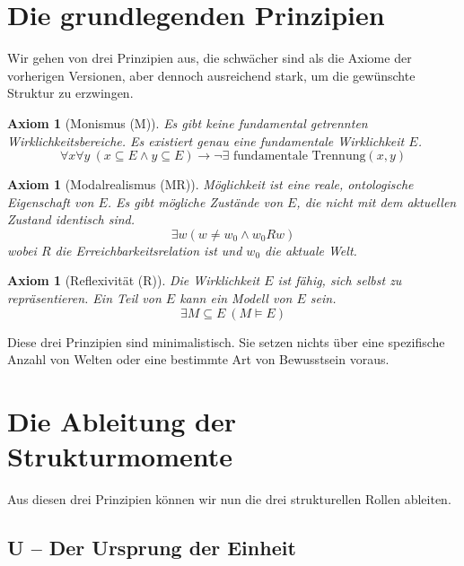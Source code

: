 \documentclass[12pt,a4paper]{article}
\newtheorem{axiom}[theorem]{Axiom}
\begin{document}
\section{Die grundlegenden Prinzipien}

Wir gehen von drei Prinzipien aus, die schwächer sind als die Axiome der vorherigen Versionen, aber dennoch ausreichend stark, um die gewünschte Struktur zu erzwingen.

\begin{axiom}[Monismus (M)]
\label{ax:monism}
Es gibt keine fundamental getrennten Wirklichkeitsbereiche. Es existiert genau eine fundamentale Wirklichkeit \(E\).
\begin{equation}
\forall x \forall y \ (x \subseteq E \land y \subseteq E) \rightarrow \neg \exists \text{ fundamentale Trennung}(x, y)
\end{equation}
\end{axiom}

\begin{axiom}[Modalrealismus (MR)]
\label{ax:modalrealism}
Möglichkeit ist eine reale, ontologische Eigenschaft von \(E\). Es gibt mögliche Zustände von \(E\), die nicht mit dem aktuellen Zustand identisch sind.
\begin{equation}
\exists w (w \neq w_0 \land w_0 R w)
\end{equation}
wobei \(R\) die Erreichbarkeitsrelation ist und \(w_0\) die aktuale Welt.
\end{axiom}

\begin{axiom}[Reflexivität (R)]
\label{ax:reflexivity}
Die Wirklichkeit \(E\) ist fähig, sich selbst zu repräsentieren. Ein Teil von \(E\) kann ein Modell von \(E\) sein.
\begin{equation}
\exists M \subseteq E \ (M \models E)
\end{equation}
\end{axiom}

Diese drei Prinzipien sind minimalistisch. Sie setzen nichts über eine spezifische Anzahl von Welten oder eine bestimmte Art von Bewusstsein voraus.

\section{Die Ableitung der Strukturmomente}

Aus diesen drei Prinzipien können wir nun die drei strukturellen Rollen ableiten.

\subsection{U – Der Ursprung der Einheit}
\end{document}
